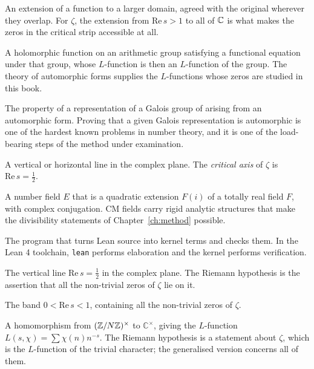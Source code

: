 \vspace{8pt}
\begin{description}[style=nextline,leftmargin=0pt,labelwidth=0pt,labelsep=0pt,font=\sffamily\bfseries\small,
  itemsep=5pt]

\item[Analytic continuation] An extension of a function to a larger domain,
agreed with the original wherever they overlap. For $\zeta$, the extension
from $\mathrm{Re}\,  s > 1$ to all of $\mathbb{C}$ is what makes the zeros in the critical strip
accessible at all.

\item[Automorphic form] A holomorphic function on an arithmetic group
satisfying a functional equation under that group, whose $L$-function is then
an $L$-function of the group. The theory of automorphic forms supplies the
$L$-functions whose zeros are studied in this book.

\item[Automorphy] The property of a representation of a Galois group of
arising from an automorphic form. Proving that a given Galois representation
is automorphic is one of the hardest known problems in number theory, and it
is one of the load-bearing steps of the method under examination.

\item[Axis] A vertical or horizontal line in the complex plane. The
\emph{critical axis} of $\zeta$ is $\mathrm{Re}\,  s = \tfrac12$.

\item[CM field] A number field $E$ that is a quadratic extension $F(i)$ of a
totally real field $F$, with complex conjugation. CM fields carry rigid
analytic structures that make the divisibility statements of Chapter~\ref{ch:method}
possible.

\item[Compiler] The program that turns Lean source into kernel terms and
checks them. In the Lean 4 toolchain, \texttt{lean} performs elaboration and
the kernel performs verification.

\item[Critical line] The vertical line $\mathrm{Re}\,  s = \tfrac12$ in the complex
plane. The Riemann hypothesis is the assertion that all the non-trivial zeros
of $\zeta$ lie on it.

\item[Critical strip] The band $0 < \mathrm{Re}\,  s < 1$, containing all the non-trivial
zeros of $\zeta$.

\item[Dirichlet character] A homomorphism from $(\mathbb{Z}/N\mathbb{Z})^\times$ to
$\mathbb{C}^\times$, giving the $L$-function $L(s,\chi) = \sum \chi(n)n^{-s}$.
The Riemann hypothesis is a statement about $\zeta$, which is the $L$-function
of the trivial character; the generalised version concerns all of them.


\end{description}
